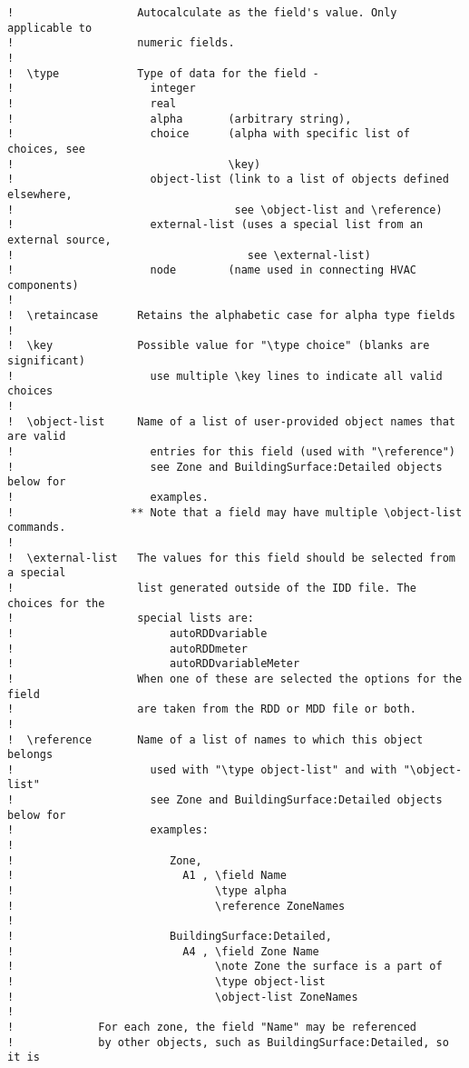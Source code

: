 \begin{lstlisting}
!                   Autocalculate as the field's value. Only applicable to
!                   numeric fields.
!
!  \type            Type of data for the field -
!                     integer
!                     real
!                     alpha       (arbitrary string),
!                     choice      (alpha with specific list of choices, see
!                                 \key)
!                     object-list (link to a list of objects defined elsewhere,
!                                  see \object-list and \reference)
!                     external-list (uses a special list from an external source,
!                                    see \external-list)
!                     node        (name used in connecting HVAC components)
!
!  \retaincase      Retains the alphabetic case for alpha type fields
!
!  \key             Possible value for "\type choice" (blanks are significant)
!                     use multiple \key lines to indicate all valid choices
!
!  \object-list     Name of a list of user-provided object names that are valid
!                     entries for this field (used with "\reference")
!                     see Zone and BuildingSurface:Detailed objects below for
!                     examples.
!                  ** Note that a field may have multiple \object-list commands.
!
!  \external-list   The values for this field should be selected from a special
!                   list generated outside of the IDD file. The choices for the
!                   special lists are:
!                        autoRDDvariable
!                        autoRDDmeter
!                        autoRDDvariableMeter
!                   When one of these are selected the options for the field
!                   are taken from the RDD or MDD file or both.
!
!  \reference       Name of a list of names to which this object belongs
!                     used with "\type object-list" and with "\object-list"
!                     see Zone and BuildingSurface:Detailed objects below for
!                     examples:
!
!                        Zone,
!                          A1 , \field Name
!                               \type alpha
!                               \reference ZoneNames
!
!                        BuildingSurface:Detailed,
!                          A4 , \field Zone Name
!                               \note Zone the surface is a part of
!                               \type object-list
!                               \object-list ZoneNames
!
!             For each zone, the field "Name" may be referenced
!             by other objects, such as BuildingSurface:Detailed, so it is

\end{lstlisting}
